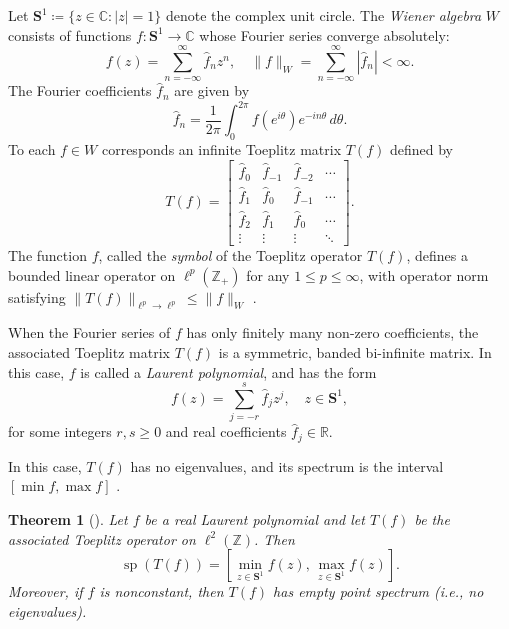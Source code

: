 \documentclass{article}
\newtheorem{theorem}{Theorem}[section]
\begin{document}
Let \( \mathbf{S}^1 \coloneqq \{ z \in \mathbb{C} : |z| = 1 \} \) denote the complex unit circle. The \emph{Wiener algebra} \( W \) consists of functions \( f : \mathbf{S}^1 \to \mathbb{C} \) whose Fourier series converge absolutely:
\[
f(z) = \sum_{n=-\infty}^{\infty} \hat{f}_n z^n, \quad \|f\|_W = \sum_{n=-\infty}^{\infty} |\hat{f}_n| < \infty.
\]
The Fourier coefficients \( \hat{f}_n \) are given by
\[
\hat{f}_n = \frac{1}{2\pi} \int_0^{2\pi} f(e^{i\theta}) e^{-in\theta} \, d\theta.
\]
To each \( f \in W \) corresponds an infinite Toeplitz matrix \( T(f) \) defined by
\[
T(f) = \begin{bmatrix}
\hat{f}_0 & \hat{f}_{-1} & \hat{f}_{-2} & \cdots \\
\hat{f}_1 & \hat{f}_0 & \hat{f}_{-1} & \cdots \\
\hat{f}_2 & \hat{f}_1 & \hat{f}_0 & \cdots \\
\vdots & \vdots & \vdots & \ddots
\end{bmatrix}.
\]
The function \( f \), called the \emph{symbol} of the Toeplitz operator \( T(f) \), defines a bounded linear operator on \( \ell^p(\mathbb{Z}_+) \) for any \( 1 \leq p \leq \infty \), with operator norm satisfying \( \|T(f)\|_{\ell^p \to \ell^p} \leq \|f\|_W \) \cite{bottcher2005spectral}.


When the Fourier series of \( f \) has only finitely many non-zero coefficients, the associated Toeplitz matrix \( T(f) \) is a symmetric, banded bi-infinite matrix. In this case, \( f \) is called a \emph{Laurent polynomial}, and has the form
\[
f(z) = \sum_{j=-r}^{s} \hat{f}_j z^j, \quad z \in \mathbf{S}^1,
\]
for some integers \( r, s \geq 0 \) and real coefficients \( \hat{f}_j \in \mathbb{R} \).

In this case, \( T(f) \) has no eigenvalues, and its spectrum is the interval \( [\min f, \max f] \) \cite[Theorem~1.4]{bottcher2000toeplitz}.

\begin{theorem}[\cite{MR36936}]\label{thm:Tk_spec}
Let \( f \) be a real Laurent polynomial and let \( T(f) \) be the associated Toeplitz operator on \( \ell^2(\mathbb{Z}) \). Then
\[
\operatorname{sp}(T(f)) = \left[ \min_{z \in \mathbf{S}^1} f(z), \, \max_{z \in \mathbf{S}^1} f(z) \right].
\]
Moreover, if \( f \) is nonconstant, then \( T(f) \) has empty point spectrum (i.e., no eigenvalues).
\end{theorem}
\end{document}

